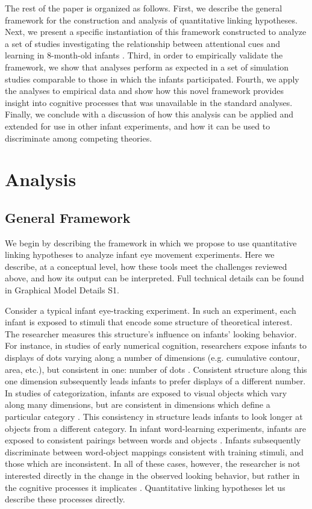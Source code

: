 \documentclass[12pt]{article}
\begin{document}
	The rest of the paper is organized as follows. First, we describe the general framework for the construction and analysis of quantitative linking hypotheses. Next, we present a specific instantiation of this framework constructed to analyze a set of studies investigating the relationship between attentional cues and learning in 8-month-old infants \cite{Wu2010a}. Third, in order to empirically validate the framework, we show that analyses perform as expected in a set of simulation studies comparable to those in which the infants participated. Fourth, we apply the analyses to empirical data and show how this novel framework provides insight into cognitive processes that was unavailable in the standard analyses. Finally, we conclude with a discussion of how this analysis can be applied and extended for use in other infant experiments, and how it can be used to discriminate among competing theories.

\section*{Analysis}

\subsection*{General Framework}

We begin by describing the framework in which we propose to use quantitative linking hypotheses to analyze infant eye movement experiments. Here we describe, at a conceptual level, how these tools meet the challenges reviewed above, and how its output can be interpreted. Full technical details can be found in Graphical Model Details S1.

	Consider a typical infant eye-tracking experiment. In such an experiment, each infant is exposed to stimuli that encode some structure of theoretical interest. The researcher measures this structure’s influence on infants’ looking behavior. For instance, in studies of early numerical cognition, researchers expose infants to displays of dots varying along a number of dimensions (e.g. cumulative contour, area, etc.), but consistent in one: number of dots \cite{Xu2000, Brannon2003}. Consistent structure along this one dimension subsequently leads infants to prefer displays of a different number. In studies of categorization, infants are exposed to visual objects which vary along many dimensions, but are consistent in dimensions which define a particular category \cite{Younger1986, Waxman1995}. This consistency in structure leads infants to look longer at objects from a different category. In infant word-learning experiments, infants are exposed to consistent pairings between words and objects \cite{Werker1998, Smith2008}. Infants subsequently discriminate between word-object mappings consistent with training stimuli, and those which are inconsistent. In all of these cases, however, the researcher is not interested directly in the change in the observed looking behavior, but rather in the cognitive processes it implicates \cite{Lashley1951, Miller2003}. Quantitative linking hypotheses let us describe these processes directly.
\end{document}
